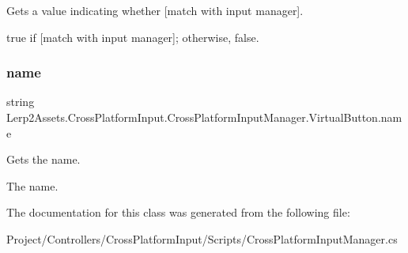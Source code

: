 Gets a value indicating whether \mbox{[}match with input manager\mbox{]}. 

{\ttfamily true} if \mbox{[}match with input manager\mbox{]}; otherwise, {\ttfamily false}.\mbox{\label{class_lerp2_assets_1_1_cross_platform_input_1_1_cross_platform_input_manager_1_1_virtual_button_a0266afd92246760f8d922f131467bc14}} 
\subsubsection{\texorpdfstring{name}{name}}
{\footnotesize\ttfamily string Lerp2\+Assets.\+Cross\+Platform\+Input.\+Cross\+Platform\+Input\+Manager.\+Virtual\+Button.\+name\hspace{0.3cm}{\ttfamily [get]}}



Gets the name. 

The name.

The documentation for this class was generated from the following file\+:\begin{DoxyCompactItemize}
\item 
Project/\+Controllers/\+Cross\+Platform\+Input/\+Scripts/Cross\+Platform\+Input\+Manager.\+cs\end{DoxyCompactItemize}
